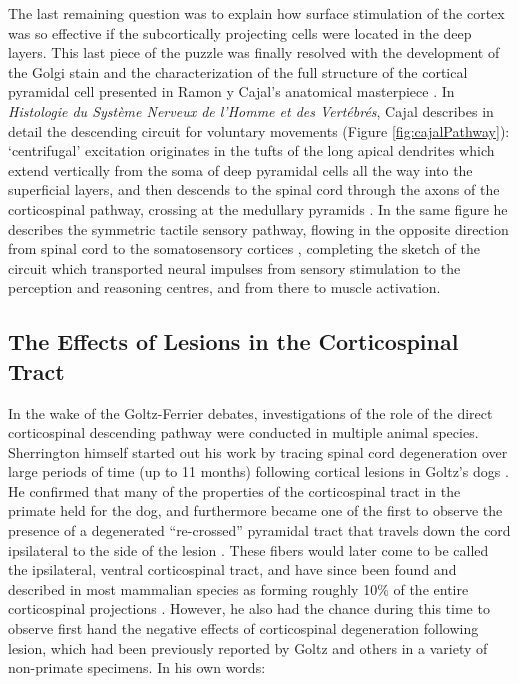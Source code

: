 The last remaining question was to explain how surface stimulation of the cortex was so effective if the subcortically projecting cells were located in the deep layers. This last piece of the puzzle was finally resolved with the development of the Golgi stain and the characterization of the full structure of the cortical pyramidal cell presented in Ramon y Cajal's anatomical masterpiece \cite{RamonYCajal1894,RamonYCajal1909}. In \emph{Histologie du Système Nerveux de l'Homme et des Vertébrés}, Cajal describes in detail the descending circuit for voluntary movements (Figure \ref{fig:cajalPathway}): ‘centrifugal’ excitation originates in the tufts of the long apical dendrites which extend vertically from the soma of deep pyramidal cells all the way into the superficial layers, and then descends to the spinal cord through the axons of the corticospinal pathway, crossing at the medullary pyramids \cite{RamonYCajal1909}. In the same figure he describes the symmetric tactile sensory pathway, flowing in the opposite direction from spinal cord to the somatosensory cortices \cite{RamonYCajal1909}, completing the sketch of the circuit which transported neural impulses from sensory stimulation to the perception and reasoning centres, and from there to muscle activation.

\subsection{The Effects of Lesions in the Corticospinal Tract}

In the wake of the Goltz-Ferrier debates, investigations of the role of the direct corticospinal descending pathway were conducted in multiple animal species. Sherrington himself started out his work by tracing spinal cord degeneration over large periods of time (up to 11 months) following cortical lesions in Goltz's dogs \cite{Langley1884,Sherrington1885}. He confirmed that many of the properties of the corticospinal tract in the primate held for the dog, and furthermore became one of the first to observe the presence of a degenerated ``re-crossed'' pyramidal tract that travels down the cord ipsilateral to the side of the lesion \cite{Sherrington1885}. These fibers would later come to be called the ipsilateral, ventral corticospinal tract, and have since been found and described in most mammalian species as forming roughly 10\% of the entire corticospinal projections \cite{Kuypers1981,Brosamle2000,Lacroix2004}. However, he also had the chance during this time to observe first hand the negative effects of corticospinal degeneration following lesion, which had been previously reported by Goltz and others in a variety of non-primate specimens. In his own words:

